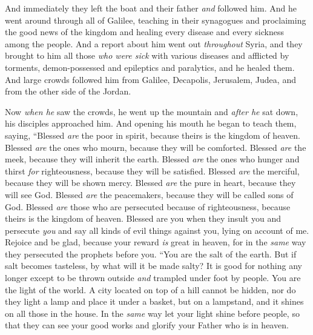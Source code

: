 \begin{biblechapter}
\verse And immediately they left the boat and their father \textit{and} followed him.
 And he went around through all of Galilee, teaching in their synagogues and proclaiming the good news of the kingdom and healing every disease and every sickness among the people.
\verse And a report about him went out \textit{throughout} Syria, and they brought to him all those \textit{who were sick} with various diseases and afflicted by torments, demon-possessed and epileptics and paralytics, and he healed them.
\verse And large crowds followed him from Galilee, Decapolis, Jerusalem, Judea, and from the other side of the Jordan.
\end{biblechapter}

\begin{biblechapter} %
 Now \textit{when he} saw the crowds, he went up the mountain and \textit{after he} sat down, his disciples approached him.
\verse And opening his mouth he began to teach them, saying,
\verse “Blessed \textit{are} the poor in spirit, 
because theirs is the kingdom of heaven.
\verse Blessed \textit{are} the ones who mourn, 
because they will be comforted.
\verse Blessed \textit{are} the meek, 
because they will inherit the earth.
\verse Blessed \textit{are} the ones who hunger and thirst \textit{for} righteousness, 
because they will be satisfied.
\verse Blessed \textit{are} the merciful, 
because they will be shown mercy.
\verse Blessed \textit{are} the pure in heart, 
because they will see God.
\verse Blessed \textit{are} the peacemakers, 
because they will be called sons of God.
\verse Blessed \textit{are} those who are persecuted because of righteousness, 
because theirs is the kingdom of heaven.
\verse Blessed are you 
when they insult you and persecute \textit{you} and say all kinds of evil things against you, lying on account of me.
\verse Rejoice and be glad, because your reward \textit{is} great in heaven, for in the \textit{same} way they persecuted the prophets before you.
 “You are the salt of the earth. But if salt becomes tasteless, by what will it be made salty? It is good for nothing any longer except to be thrown outside \textit{and} trampled under foot by people.
\verse You are the light of the world. A city located on top of a hill cannot be hidden,
\verse nor do they light a lamp and place it under a basket, but on a lampstand, and it shines on all those in the house.
\verse In the \textit{same} way let your light shine before people, so that they can see your good works and glorify your Father who is in heaven.

\end{biblechapter}
